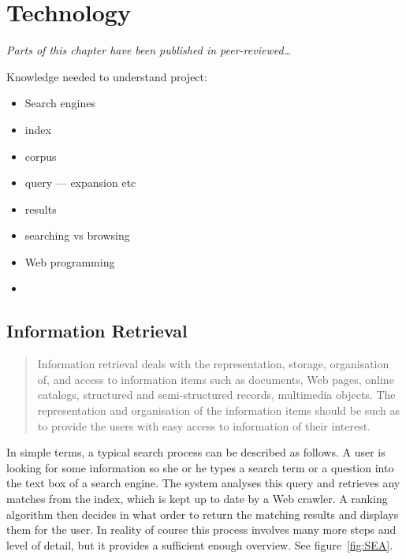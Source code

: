 
\chapter{Technology}
\label{ch:technology}

\emph{Parts of this chapter have been published in peer-reviewed\ldots}

\grule %

Knowledge needed to understand project:
\begin{itemize}
  \item Search engines
  \item index
  \item corpus
  \item query --- expansion etc
  \item results
  \item searching vs browsing
  \item Web programming
  \item
\end{itemize}


\section{Information Retrieval}

\begin{quote}
  Information retrieval deals with the representation, storage, organisation of, and access to information items such as documents, Web pages, online catalogs, structured and semi-structured records, multimedia objects. The representation and organisation of the information items should be such as to provide the users with easy access to information of their interest. \autocite{Baeza-Yates2011}
\end{quote}

In simple terms, a typical search process can be described as follows. A user is looking for some information so she or he types a search term or a question into the text box of a search engine. The system analyses this query and retrieves any matches from the index, which is kept up to date by a Web crawler. A ranking algorithm then decides in what order to return the matching results and displays them for the user. In reality of course this process involves many more steps and level of detail, but it provides a sufficient enough overview. See figure~\ref{fig:SEA}.


